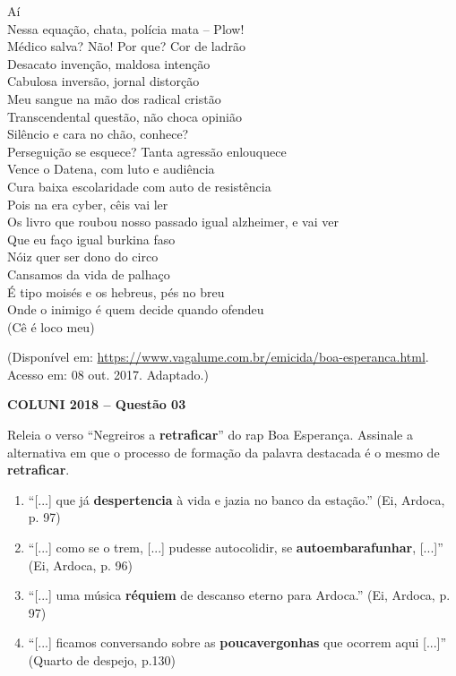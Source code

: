 \noindent
Aí\\
Nessa equação, chata, polícia mata -- Plow!\\
Médico salva? Não! Por que? Cor de ladrão\\
Desacato invenção, maldosa intenção\\
Cabulosa inversão, jornal distorção\\
Meu sangue na mão dos radical cristão\\
Transcendental questão, não choca opinião\\
Silêncio e cara no chão, conhece?\\
Perseguição se esquece? Tanta agressão enlouquece\\
Vence o Datena, com luto e audiência\\
Cura baixa escolaridade com auto de resistência\\
Pois na era cyber, cêis vai ler\\
Os livro que roubou nosso passado igual alzheimer, e vai ver\\
Que eu faço igual burkina faso\\
Nóiz quer ser dono do circo\\
Cansamos da vida de palhaço\\
É tipo moisés e os hebreus, pés no breu\\
Onde o inimigo é quem decide quando ofendeu\\
(Cê é loco meu)\\
[...]

\vspace{0.3cm}

\begin{center}
\footnotesize
(Disponível em: \url{https://www.vagalume.com.br/emicida/boa-esperanca.html}.
Acesso em: 08 out. 2017. Adaptado.)
\end{center}


\textbf{COLUNI 2018 -- Questão 03}\par\medskip Releia o verso “Negreiros a \textbf{retraficar}” do rap Boa Esperança. Assinale a alternativa em que o processo de formação da palavra destacada é o mesmo de \textbf{retraficar}.

\begin{enumerate}
\item “[...] que já \textbf{despertencia} à vida e jazia no banco da estação.” (Ei, Ardoca, p. 97)
\item “[...] como se o trem, [...] pudesse autocolidir, se \textbf{autoembarafunhar}, [...]” (Ei, Ardoca, p. 96)
\item “[...] uma música \textbf{réquiem} de descanso eterno para Ardoca.” (Ei, Ardoca, p. 97)
\item “[...] ficamos conversando sobre as \textbf{poucavergonhas} que ocorrem aqui [...]” (Quarto de despejo, p.130)\end{enumerate}
